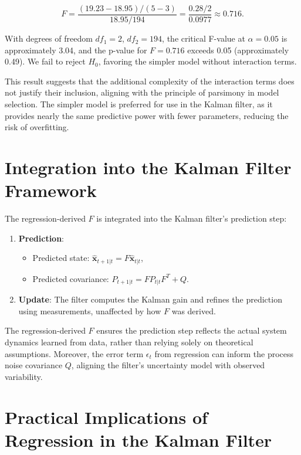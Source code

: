 \documentclass[12pt]{article}
\begin{document}
\begin{equation}
    F = \frac{(19.23 - 18.95) / (5 - 3)}{18.95 / 194} = \frac{0.28 / 2}{0.0977} \approx 0.716.
    \label{eq:f_calculation}
\end{equation}

With degrees of freedom \( df_1 = 2 \), \( df_2 = 194 \), the critical F-value at \( \alpha = 0.05 \) is approximately 3.04, and the p-value for \( F = 0.716 \) exceeds 0.05 (approximately 0.49). We fail to reject \( H_0 \), favoring the simpler model without interaction terms.

This result suggests that the additional complexity of the interaction terms does not justify their inclusion, aligning with the principle of parsimony in model selection. The simpler model is preferred for use in the Kalman filter, as it provides nearly the same predictive power with fewer parameters, reducing the risk of overfitting.

\section{Integration into the Kalman Filter Framework}
\label{sec:integration}

The regression-derived \( F \) is integrated into the Kalman filter’s prediction step:

\begin{enumerate}
    \item \textbf{Prediction}:
    \begin{itemize}
        \item Predicted state: \( \hat{\mathbf{x}}_{t+1|t} = F \hat{\mathbf{x}}_{t|t} \),
        \item Predicted covariance: \( P_{t+1|t} = F P_{t|t} F^T + Q \).
    \end{itemize}
    \item \textbf{Update}: The filter computes the Kalman gain and refines the prediction using measurements, unaffected by how \( F \) was derived.
\end{enumerate}

The regression-derived \( F \) ensures the prediction step reflects the actual system dynamics learned from data, rather than relying solely on theoretical assumptions. Moreover, the error term \( \epsilon_t \) from regression can inform the process noise covariance \( Q \), aligning the filter’s uncertainty model with observed variability.

\section{Practical Implications of Regression in the Kalman Filter}
\label{sec:implications}
\end{document}
